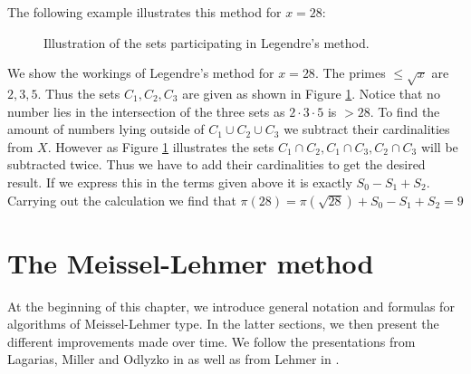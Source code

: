 The following example illustrates this method for $x = 28$:
\begin{eg}
	\begin{figure}[htpb]
		\centering
		\def\svgwidth{0.65\textwidth}
		
		\caption{Illustration of the sets participating in Legendre's method.}
		\label{fig:legendre}
	\end{figure}
	We show the workings of Legendre's method for $x = 28$. The primes $ \leq \sqrt{x}$ 
	are $2,3,5$. Thus the sets  $C_1,C_2,C_3$ are given as shown in Figure \ref{fig:legendre}.
	Notice that no number lies in the intersection of the three sets as $2\cdot 3\cdot 5$ is $> 28$.
	To find the amount of numbers lying outside of $C_1 \cup C_2 \cup C_3$ we subtract
	their cardinalities from $X$. However as Figure \ref{fig:legendre} illustrates the sets
	$C_1 \cap C_2, C_1 \cap C_3, C_2 \cap C_3$ will be subtracted twice.
	Thus we have to add their cardinalities to get the desired result. If we express this in the terms given above it is exactly
	$S_0 - S_1 + S_2$.
	Carrying out the calculation we find that $\pi(28) = \pi(\sqrt{28}) + S_0 - S_1 + S_2 = 9$
\end{eg}

\section{The Meissel-Lehmer method}
\label{sec:meissellehmer}
At the beginning of this chapter, we introduce general notation and formulas for algorithms of Meissel-Lehmer type.
In the latter sections, we then present the different improvements made over time.
We follow the presentations from Lagarias, Miller and Odlyzko in \cite{lagarias85} as well as from Lehmer in \cite{lehmer59}.

